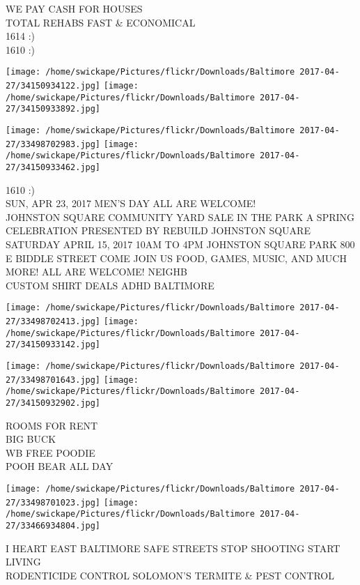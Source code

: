 \documentclass[10pt,letterpaper]{article}
\begin{document}
WE PAY CASH FOR HOUSES\\
TOTAL REHABS FAST \& ECONOMICAL\\
1614 :)\\
1610 :)
\pagebreak

\texttt{[image: /home/swickape/Pictures/flickr/Downloads/Baltimore 2017-04-27/34150934122.jpg]}
\texttt{[image: /home/swickape/Pictures/flickr/Downloads/Baltimore 2017-04-27/34150933892.jpg]}

\texttt{[image: /home/swickape/Pictures/flickr/Downloads/Baltimore 2017-04-27/33498702983.jpg]}
\texttt{[image: /home/swickape/Pictures/flickr/Downloads/Baltimore 2017-04-27/34150933462.jpg]}

1610 :)\\
SUN, APR 23, 2017 MEN'S DAY ALL ARE WELCOME!\\
JOHNSTON SQUARE COMMUNITY YARD SALE IN THE PARK A SPRING CELEBRATION PRESENTED BY REBUILD JOHNSTON SQUARE SATURDAY APRIL 15, 2017 10AM TO 4PM JOHNSTON SQUARE PARK 800 E BIDDLE STREET COME JOIN US FOOD, GAMES, MUSIC, AND MUCH MORE! ALL ARE WELCOME!  NEIGHB\\
CUSTOM SHIRT DEALS ADHD BALTIMORE
\pagebreak

\texttt{[image: /home/swickape/Pictures/flickr/Downloads/Baltimore 2017-04-27/33498702413.jpg]}
\texttt{[image: /home/swickape/Pictures/flickr/Downloads/Baltimore 2017-04-27/34150933142.jpg]}

\texttt{[image: /home/swickape/Pictures/flickr/Downloads/Baltimore 2017-04-27/33498701643.jpg]}
\texttt{[image: /home/swickape/Pictures/flickr/Downloads/Baltimore 2017-04-27/34150932902.jpg]}

ROOMS FOR RENT\\
BIG BUCK\\
WB FREE POODIE\\
POOH BEAR ALL DAY
\pagebreak

\texttt{[image: /home/swickape/Pictures/flickr/Downloads/Baltimore 2017-04-27/33498701023.jpg]}
\texttt{[image: /home/swickape/Pictures/flickr/Downloads/Baltimore 2017-04-27/33466934804.jpg]}

I HEART EAST BALTIMORE SAFE STREETS STOP SHOOTING START LIVING\\
RODENTICIDE CONTROL SOLOMON'S TERMITE \& PEST CONTROL
\pagebreak
\end{document}
